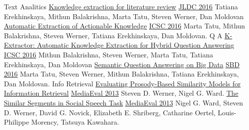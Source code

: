 \documentclass[]{friggeri-cv} %
\begin{document}
\begin{entrylist}
\entry
{Text Analitics}
{\href{https://www.computer.org/csdl/proceedings/jcdl/2016/4229/00/07559594-abs.html}{Knowledge extraction for literature review}}
{\href{https://www.computer.org/csdl/proceedings/jcdl/2016/4229/00/index.html}{JLDC 2016}}
{\small{Tatiana Erekhinskaya, Mithun Balakrishna, Marta Tatu, Steven Werner, Dan Moldovan}}
\entry
{}
{\href{https://www.computer.org/csdl/proceedings/icsc/2016/0662/00/0662a396-abs.html}{Automatic Extraction of Actionable Knowledge}}
{\href{https://www.computer.org/csdl/proceedings/icsc/2016/0662/00/index.html}{ICSC 2016}}
{\small{Marta Tatu, Mithun Balakrishna, Steven Werner, Tatiana Erekhinskaya, Dan Moldovan.}}
\entry
{Q A}
{\href{https://www.computer.org/csdl/proceedings/icsc/2016/0662/00/0662a390-abs.html}{K-Extractor: \small{Automatic Knowledge Extraction for Hybrid Question Answering}}}
{\href{https://www.computer.org/csdl/proceedings/icsc/2016/0662/00/index.html}{ICSC 2016}}
{\small{Mithun Balakrishna, Steven Werner, Marta Tatu, Tatiana Erekhinskaya, Dan Moldovan}}
\entry
{}
{\href{http://dl.acm.org/citation.cfm?id=2928302}{Semantic Question Answering on Big Data}}
{\href{https://www.ifis.uni-luebeck.de/~groppe/sbd/2016}{SBD 2016}}
{\small{Marta Tatu, Steven Werner, Mithun Balakrishna, Tatiana Erekhinskaya, Dan Moldovan.}}
\entry
{Info Retrieval}
{\href{http://ceur-ws.org/Vol-1043/mediaeval2013_submission_52.pdf}{Evaluating Prosody-Based Similarity Models for Information Retrieval}}
{\href{http://ceur-ws.org/Vol-1043/}{MediaEval 2013}}
{Steven D. Werner, Nigel G. Ward.}
\entry
{}
{\href{http://ceur-ws.org/Vol-1043/mediaeval2013_submission_2.pdf}{The Similar Segments in Social Speech Task} }
{\href{http://ceur-ws.org/Vol-1043/}{MediaEval 2013}}
{\small{Nigel G. Ward, Steven D. Werner, David G. Novick, Elizabeth E. Shriberg, Catharine Oertel, Louis-Philippe Morency, Tatsuya Kawahara.}}

\end{entrylist}
\end{document}
